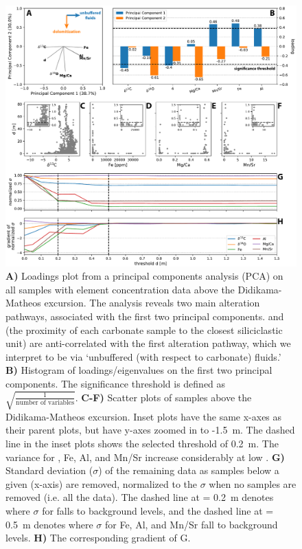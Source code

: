 \begin{figure}[!htbp]
\begin{center}
	\includegraphics[width=\textwidth]{figures/Tambien/siliciclastic-filtering.pdf}
	\caption[Principal components analysis on carbonate geochemical data.]{\textbf{A)} Loadings plot from a principal components analysis (PCA) on all samples with element concentration data above the Didikama-Matheos excursion. The analysis reveals two main alteration pathways, associated with the first two principal components. \dC and \dsil (the proximity of each carbonate sample to the closest siliciclastic unit) are anti-correlated with the first alteration pathway, which we interpret to be via `unbuffered (with respect to carbonate) fluids.' \textbf{B)} Histogram of loadings/eigenvalues on the first two principal components. The significance threshold is defined as $\sqrt{\frac{1}{\text{number of variables}}}$. \textbf{C-F)} Scatter plots of samples above the Didikama-Matheos excursion. Inset plots have the same x-axes as their parent plots, but have y-axes zoomed in to -1.5~m. The dashed line in the inset plots shows the selected \dsil threshold of 0.2~m. The variance for \dC, Fe, Al, and Mn/Sr increase considerably at low \dsil. \textbf{G)} Standard deviation ($\sigma$) of the remaining data as samples below a given \dsil (x-axis) are removed, normalized to the $\sigma$ when no samples are removed (i.e. all the data). The dashed line at \dsil = 0.2~m denotes where $\sigma$ for \dC falls to background levels, and the dashed line at \dsil = 0.5~m denotes where $\sigma$ for Fe, Al, and Mn/Sr fall to background levels. \textbf{H)} The corresponding gradient of G.}
	\label{fig:siliciclastic-filtering}
\end{center}
\end{figure}

